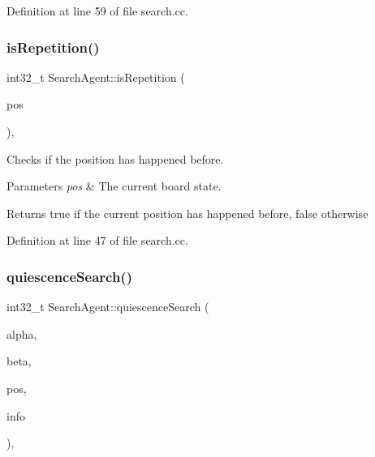 Definition at line 59 of file search.\+cc.

\mbox{\label{classSearchAgent_acbc393afa5ab599c1bf3ffcd279b60a7}} 
\subsubsection{\texorpdfstring{is\+Repetition()}{isRepetition()}}
{\footnotesize\ttfamily int32\+\_\+t Search\+Agent\+::is\+Repetition (\begin{DoxyParamCaption}\item[{const \mbox{\hyperlink{classBoard}{Board}} \&}]{pos }\end{DoxyParamCaption})\hspace{0.3cm}{\ttfamily [private]}, {\ttfamily [noexcept]}}



Checks if the position has happened before. 


\begin{DoxyParams}{Parameters}
{\em pos} & The current board state. \\
\hline
\end{DoxyParams}
\begin{DoxyReturn}{Returns}
true if the current position has happened before, false otherwise 
\end{DoxyReturn}


Definition at line 47 of file search.\+cc.

\mbox{\label{classSearchAgent_a0a66b7b202216f6e794a963df3a83cb2}} 
\subsubsection{\texorpdfstring{quiescence\+Search()}{quiescenceSearch()}}
{\footnotesize\ttfamily int32\+\_\+t Search\+Agent\+::quiescence\+Search (\begin{DoxyParamCaption}\item[{int32\+\_\+t}]{alpha,  }\item[{int32\+\_\+t}]{beta,  }\item[{\mbox{\hyperlink{classBoard}{Board}} \&}]{pos,  }\item[{\mbox{\hyperlink{structSearchInfo}{Search\+Info}} \&}]{info }\end{DoxyParamCaption})\hspace{0.3cm}{\ttfamily [private]}, {\ttfamily [noexcept]}}



